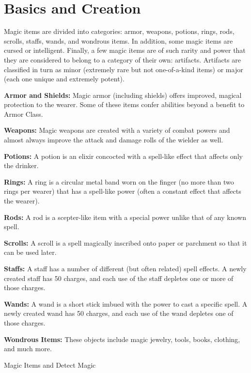 
\section{Basics and Creation}

Magic items are divided into categories: armor, weapons, potions, rings, rods, 
scrolls, staffs, wands, and wondrous items. In addition, some magic items are cursed 
or intelligent. Finally, a few magic items are of such rarity and power that they 
are considered to belong to a category of their own: artifacts. Artifacts are classified 
in turn as minor (extremely rare but not one-of-a-kind items) or major (each one 
unique and extremely potent).

\textbf{Armor and Shields:} Magic armor (including shields) offers improved, magical 
protection to the wearer. Some of these items confer abilities beyond a benefit 
to Armor Class. 

\textbf{Weapons:} Magic weapons are created with a variety of combat powers and 
almost always improve the attack and damage rolls of the wielder as well.

\textbf{Potions:} A potion is an elixir concocted with a spell-like effect that 
affects only the drinker.

\textbf{Rings:} A ring is a circular metal band worn on the finger (no more than 
two rings per wearer) that has a spell-like power (often a constant effect that 
affects the wearer).

\textbf{Rods: }A rod is a scepter-like item with a special power unlike that of 
any known spell.

\textbf{Scrolls:} A scroll is a spell magically inscribed onto paper or parchment 
so that it can be used later.

\textbf{Staffs:} A staff has a number of different (but often related) spell effects. 
A newly created staff has 50 charges, and each use of the staff depletes one or 
more of those charges.

\textbf{Wands:} A wand is a short stick imbued with the power to cast a specific 
spell. A newly created wand has 50 charges, and each use of the wand depletes one 
of those charges.

\textbf{Wondrous Items:} These objects include magic jewelry, tools, books, clothing, 
and much more.

\vspace{12pt}
Magic Items and Detect Magic

